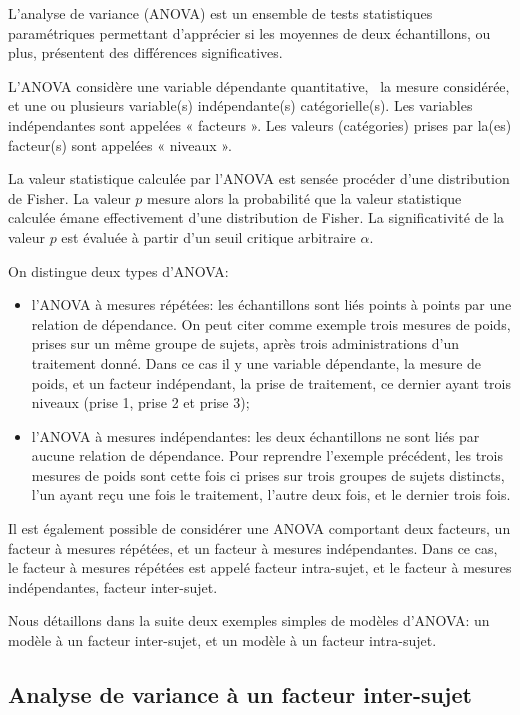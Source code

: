 L'analyse de variance (ANOVA) est un ensemble de tests statistiques paramétriques permettant d'apprécier si les moyennes de deux échantillons, ou plus, présentent des différences significatives.

L'ANOVA considère une variable dépendante quantitative, \ie~la mesure considérée, et une ou plusieurs variable(s) indépendante(s) catégorielle(s). Les variables indépendantes sont appelées « facteurs ». Les valeurs (catégories) prises par la(es) facteur(s) sont appelées « niveaux ».

La valeur statistique calculée par l'ANOVA est sensée procéder d'une distribution de Fisher. La valeur $p$ mesure alors la probabilité que la valeur statistique calculée émane effectivement d'une distribution de Fisher. La significativité de la valeur $p$ est évaluée à partir d'un seuil critique arbitraire $\alpha$.

On distingue deux types d'ANOVA:

\begin{itemize}
\item l'ANOVA à mesures répétées: les échantillons sont liés points à points par une relation de dépendance. On peut citer comme exemple trois mesures de poids, prises sur un même groupe de sujets, après trois administrations d'un traitement donné. Dans ce cas il y une variable dépendante, la mesure de poids, et un facteur indépendant, la prise de traitement, ce dernier ayant trois niveaux (prise 1, prise 2 et prise 3);  
\item l'ANOVA à mesures indépendantes: les deux échantillons ne sont liés par aucune relation de dépendance. Pour reprendre l'exemple précédent, les trois mesures de poids sont cette fois ci prises sur trois groupes de sujets distincts, l'un ayant reçu une fois le traitement, l'autre deux fois, et le dernier trois fois.
\end{itemize}

Il est également possible de considérer une ANOVA comportant deux facteurs, un facteur à mesures répétées, et un facteur à mesures indépendantes. Dans ce cas, le facteur à mesures répétées est appelé facteur intra-sujet, et le facteur à mesures indépendantes, facteur inter-sujet. 

Nous détaillons dans la suite deux exemples simples de modèles d'ANOVA: un modèle à un facteur inter-sujet, et un modèle à un facteur intra-sujet.

\subsection*{Analyse de variance à un facteur inter-sujet}

